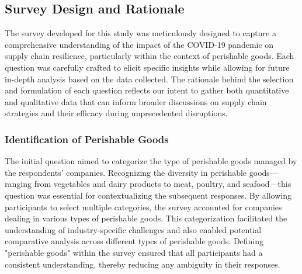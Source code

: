 \subsection{Survey Design and Rationale}

The survey developed for this study was meticulously designed to capture a comprehensive understanding of the impact of the COVID-19 pandemic on supply chain resilience, particularly within the context of perishable goods. Each question was carefully crafted to elicit specific insights while allowing for future in-depth analysis based on the data collected. The rationale behind the selection and formulation of each question reflects our intent to gather both quantitative and qualitative data that can inform broader discussions on supply chain strategies and their efficacy during unprecedented disruptions.

\subsubsection*{Identification of Perishable Goods}
The initial question aimed to categorize the type of perishable goods managed by the respondents' companies. Recognizing the diversity in perishable goods—ranging from vegetables and dairy products to meat, poultry, and seafood—this question was essential for contextualizing the subsequent responses. By allowing participants to select multiple categories, the survey accounted for companies dealing in various types of perishable goods. This categorization facilitated the understanding of industry-specific challenges and also enabled potential comparative analysis across different types of perishable goods. Defining "perishable goods" within the survey ensured that all participants had a consistent understanding, thereby reducing any ambiguity in their responses.

